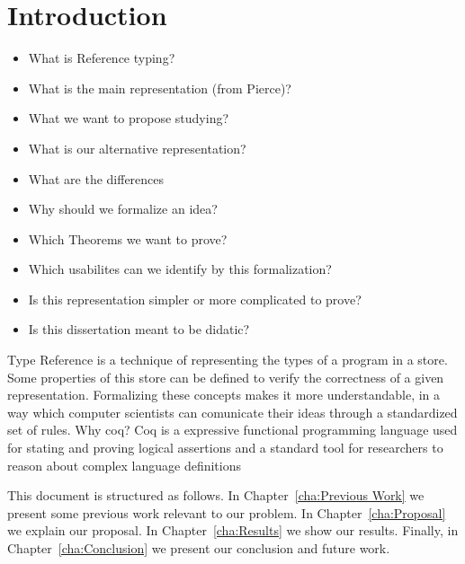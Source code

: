 
\chapter{Introduction}
\begin{itemize}
    \color{red}
    \item What is Reference typing?
    \item What is the main representation (from Pierce)?
    \item What we want to propose studying?
    \item What is our alternative representation?
    \item What are the differences
    \item Why should we formalize an idea?
    \item Which Theorems we want to prove?
    \item Which usabilites can we identify by this formalization?
    \item Is this representation simpler or more complicated to prove?
    \item Is this dissertation meant to be didatic?
\end{itemize}
Type Reference is a technique of representing the types of a program in a store. Some properties of this store can be defined to verify the correctness of a given representation. Formalizing these concepts makes it more understandable, in a way which computer scientists can comunicate their ideas through a standardized set of rules.
Why coq? Coq is a expressive functional programming language used for stating and proving logical assertions and a standard tool for researchers to reason about complex language definitions \cite{Pierce_SF1}



This document is structured as follows. In Chapter~\ref{cha:Previous Work} we present some previous work relevant to our problem. In Chapter~\ref{cha:Proposal} we explain our proposal. In Chapter~\ref{cha:Results} we show our results. Finally, in Chapter~\ref{cha:Conclusion} we present our conclusion and future work.



